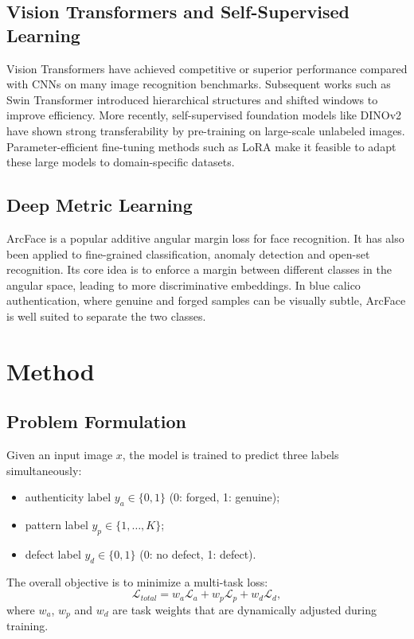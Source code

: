 \documentclass[preprint,12pt,a4paper]{elsarticle}
\begin{document}
\subsection{Vision Transformers and Self-Supervised Learning}

Vision Transformers \citep{dosovitskiy2020image} have achieved competitive or superior performance compared with CNNs on many image recognition benchmarks.
Subsequent works such as Swin Transformer \citep{liu2021swin} introduced hierarchical structures and shifted windows to improve efficiency.
More recently, self-supervised foundation models like DINOv2 \citep{oquab2023dinov2} have shown strong transferability by pre-training on large-scale unlabeled images.
Parameter-efficient fine-tuning methods such as LoRA \citep{hu2021lora} make it feasible to adapt these large models to domain-specific datasets.

\subsection{Deep Metric Learning}

ArcFace \citep{deng2019arcface} is a popular additive angular margin loss for face recognition.
It has also been applied to fine-grained classification, anomaly detection and open-set recognition.
Its core idea is to enforce a margin between different classes in the angular space, leading to more discriminative embeddings.
In blue calico authentication, where genuine and forged samples can be visually subtle, ArcFace is well suited to separate the two classes.

\section{Method}\label{sec:method}

\subsection{Problem Formulation}

Given an input image $x$, the model is trained to predict three labels simultaneously:
\begin{itemize}
    \item authenticity label $y_a \in \{0, 1\}$ (0: forged, 1: genuine);
    \item pattern label $y_p \in \{1, \dots, K\}$;
    \item defect label $y_d \in \{0, 1\}$ (0: no defect, 1: defect).
\end{itemize}
The overall objective is to minimize a multi-task loss:
\begin{equation}
    \mathcal{L}_{total} = w_a \mathcal{L}_a + w_p \mathcal{L}_p + w_d \mathcal{L}_d,
\end{equation}
where $w_a$, $w_p$ and $w_d$ are task weights that are dynamically adjusted during training.
\end{document}
